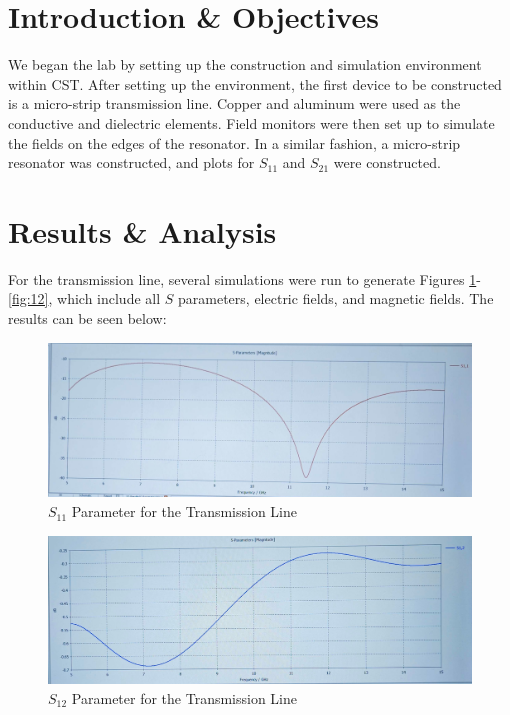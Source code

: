 \documentclass[
	letterpaper, %
	10pt, %
]{CSUniSchoolLabReport}
\begin{document}
\section{Introduction \& Objectives}

We began the lab by setting up the construction and simulation environment within CST. After setting up the environment, the first device to be constructed is a micro-strip transmission line. Copper and aluminum were used as the conductive and dielectric elements. Field monitors were then set up to simulate the fields on the edges of the resonator. In a similar fashion, a micro-strip resonator was constructed, and plots for $S_{11}$ and $S_{21}$ were constructed.

\section{Results \& Analysis} 

For the transmission line, several simulations were run to generate Figures \ref{fig:1}-\ref{fig:12}, which include all $S$ parameters, electric fields, and magnetic fields. The results can be seen below:

\begin{figure}[H]
  \centering
  \includegraphics[width=.9\textwidth]{Figures/Lab Four/Line_S11.jpg}
  \caption{$S_{11}$ Parameter for the Transmission Line}
  \label{fig:1}
\end{figure}

\begin{figure}[H]
  \centering
  \includegraphics[width=.9\textwidth]{Figures/Lab Four/Line_S12.jpg}
  \caption{$S_{12}$ Parameter for the Transmission Line}
  \label{fig:2}
\end{figure}
\end{document}
